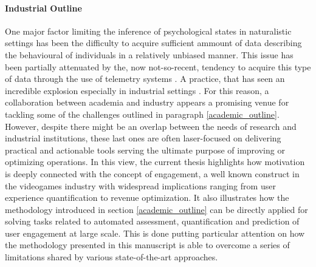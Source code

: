 \paragraph*{Industrial Outline}
\label{industrial_outline}
One major factor limiting the inference of psychological states in naturalistic settings has been the difficulty to acquire sufficient ammount of data describing the behavioural of individuals in a relatively unbiased manner. This issue has been partially attenuated by the, now not-so-recent, tendency to acquire this type of data through the use of telemetry systems \cite{el2016game, drachen2015behavioral}. A practice, that has seen an incredible explosion especially in industrial settings \cite{el2016game, drachen2015behavioral,EUdataregulations2018}. For this reason, a collaboration between academia and industry appears a promising venue for tackling some of the challenges outlined in paragraph \ref{academic_outline}. However, despite there might be an overlap between the needs of research and industrial institutions, these last ones are often laser-focused on delivering practical and actionable tools serving the ultimate purpose of improving or optimizing operations. In this view, the current thesis highlights how motivation is deeply connected with the concept of engagement, a well known construct in the videogames industry with widespread implications ranging from user experience quantification to revenue optimization. It also illustrates how the methodology introduced in section \ref{academic_outline} can be directly applied for solving tasks related to automated assessment, quantification and prediction of user engagement at large scale. This is done putting particular attention on how the methodology presented in this manuscript is able to overcome a series of limitations shared by various state-of-the-art approaches. 
\\
\\
